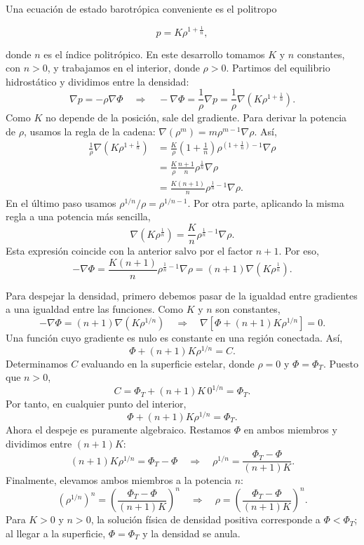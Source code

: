 Una ecuación de estado barotrópica conveniente es el politropo

$$ p = K\rho^{1 + \frac{1}{n}}, $$

donde $n$ es el índice politrópico. En este desarrollo tomamos $K$ y $n$ constantes, con $n>0$, y trabajamos en el interior, donde $\rho>0$. Partimos del equilibrio hidrostático y dividimos entre la densidad:
$$
\nabla p=-\rho\nabla\Phi
\quad\Longrightarrow\quad
-\nabla\Phi=\frac{1}{\rho}\nabla p
=\frac{1}{\rho}\nabla\left(K\rho^{1+\frac{1}{n}}\right).
$$
Como $K$ no depende de la posición, sale del gradiente. Para derivar la potencia de $\rho$, usamos la regla de la cadena: $\nabla(\rho^m)=m\rho^{m-1}\nabla\rho$. Así,
$$
\begin{aligned}
\frac{1}{\rho}\nabla\left(K\rho^{1+\frac{1}{n}}\right)
&=\frac{K}{\rho}\left(1+\frac{1}{n}\right)
\rho^{\left(1+\frac{1}{n}\right)-1}\nabla\rho\\
&=\frac{K}{\rho}\frac{n+1}{n}\rho^{\frac{1}{n}}\nabla\rho\\
&=\frac{K(n+1)}{n}\rho^{\frac{1}{n}-1}\nabla\rho.
\end{aligned}
$$
En el último paso usamos $\rho^{1/n}/\rho=\rho^{1/n-1}$. Por otra parte, aplicando la misma regla a una potencia más sencilla,
$$
\nabla\left(K\rho^{\frac{1}{n}}\right)
=\frac{K}{n}\rho^{\frac{1}{n}-1}\nabla\rho.
$$
Esta expresión coincide con la anterior salvo por el factor $n+1$. Por eso,
$$
\boxed{
-\nabla\Phi
=\frac{K(n+1)}{n}\rho^{\frac{1}{n}-1}\nabla\rho
=(n+1)\nabla\left(K\rho^{\frac{1}{n}}\right)
}.
$$

Para despejar la densidad, primero debemos pasar de la igualdad entre gradientes a una igualdad entre las funciones. Como $K$ y $n$ son constantes,
$$
-\nabla\Phi=(n+1)\nabla\left(K\rho^{1/n}\right)
\quad\Longrightarrow\quad
\nabla\left[\Phi+(n+1)K\rho^{1/n}\right]=0.
$$
Una función cuyo gradiente es nulo es constante en una región conectada. Así,
$$
\Phi+(n+1)K\rho^{1/n}=C.
$$
Determinamos $C$ evaluando en la superficie estelar, donde $\rho=0$ y $\Phi=\Phi_T$. Puesto que $n>0$,
$$
C=\Phi_T+(n+1)K\,0^{1/n}=\Phi_T.
$$
Por tanto, en cualquier punto del interior,
$$
\Phi+(n+1)K\rho^{1/n}=\Phi_T.
$$
Ahora el despeje es puramente algebraico. Restamos $\Phi$ en ambos miembros y dividimos entre $(n+1)K$:
$$
(n+1)K\rho^{1/n}=\Phi_T-\Phi
\quad\Longrightarrow\quad
\rho^{1/n}=\frac{\Phi_T-\Phi}{(n+1)K}.
$$
Finalmente, elevamos ambos miembros a la potencia $n$:
$$
\left(\rho^{1/n}\right)^n
=\left(\frac{\Phi_T-\Phi}{(n+1)K}\right)^n
\quad\Longrightarrow\quad
\boxed{\rho=\left(\frac{\Phi_T-\Phi}{(n+1)K}\right)^n}.
$$
Para $K>0$ y $n>0$, la solución física de densidad positiva corresponde a $\Phi<\Phi_T$; al llegar a la superficie, $\Phi=\Phi_T$ y la densidad se anula.

